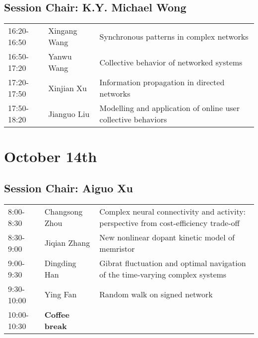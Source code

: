 \documentclass[oneside,A4paper,12pt]{article}
\begin{document}
\subsection*{Session \uppercase\expandafter{}  \hspace{5mm} Chair: K.Y. Michael Wong}
\label{sec:org86c6356}

\begin{center}
\begin{tabular}{p{2.5cm}p{4cm}p{8.5cm}}
\hline
16:20-16:50 & Xingang Wang & Synchronous patterns in complex networks\\
16:50-17:20 & Yanwu Wang & Collective behavior of networked systems\\
17:20-17:50 & Xinjian Xu & Information propagation in directed networks\\
17:50-18:20 & Jianguo Liu & Modelling and application of online user collective behaviors\\
\hline
\end{tabular}
\end{center}



\newpage
\section*{October 14th}
\label{sec:org80ea109}

\subsection*{Session \uppercase\expandafter{}  \hspace{10mm} Chair: Aiguo Xu}
\label{sec:org0fb918a}

\begin{center}
\begin{tabular}{p{2.5cm}p{4cm}p{8.5cm}}
\hline
8:00-8:30 & Changsong Zhou & Complex neural connectivity and activity: perspective from cost-efficiency trade-off\\
8:30-9:00 & Jiqian Zhang & New nonlinear dopant kinetic model of memristor\\
9:00-9:30 & Dingding Han & Gibrat fluctuation and optimal navigation of the time-varying complex systems\\
9:30-10:00 & Ying Fan & Random walk on signed network\\
\cellcolor{blue!25}10:00-10:30 & \cellcolor{blue!25}\textbf{Coffee break} & \cellcolor{blue!25}\\
\hline
\end{tabular}
\end{center}
\end{document}
